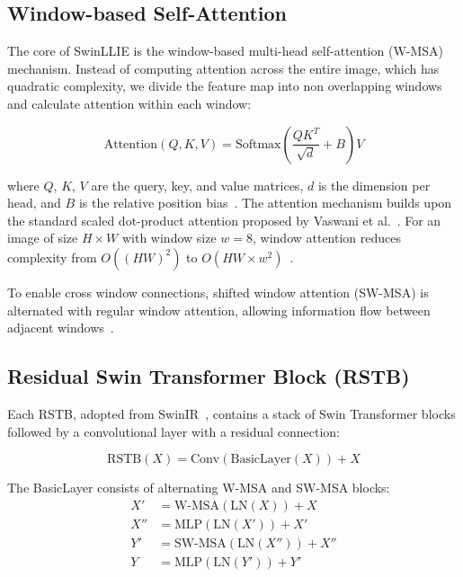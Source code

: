 \documentclass[sigconf]{acmart}
\begin{document}
\subsection{Window-based Self-Attention}

The core of SwinLLIE is the window-based multi-head self-attention (W-MSA) mechanism. Instead of computing attention across the entire image, which has quadratic complexity, we divide the feature map into non overlapping windows and calculate attention within each window:

\begin{equation}
\text{Attention}(Q, K, V) = \text{Softmax}\left(\frac{QK^T}{\sqrt{d}} + B\right)V
\end{equation}

where $Q$, $K$, $V$ are the query, key, and value matrices, $d$ is the dimension per head, and $B$ is the relative position bias~\cite{liu2021swin}. The attention mechanism builds upon the standard scaled dot-product attention proposed by Vaswani et al.~\cite{vaswani2017attention}. For an image of size $H \times W$ with window size $w = 8$, window attention reduces complexity from $O((HW)^2)$ to $O(HW \times w^2)$~\cite{liu2021swin}.

To enable cross window connections, shifted window attention (SW-MSA) is alternated with regular window attention, allowing information flow between adjacent windows~\cite{liu2021swin}.

\subsection{Residual Swin Transformer Block (RSTB)}

Each RSTB, adopted from SwinIR~\cite{liang2021swinir}, contains a stack of Swin Transformer blocks followed by a convolutional layer with a residual connection:

\begin{equation}
\text{RSTB}(X) = \text{Conv}(\text{BasicLayer}(X)) + X
\end{equation}

The BasicLayer consists of alternating W-MSA and SW-MSA blocks:
\begin{equation}
\begin{aligned}
X' &= \text{W-MSA}(\text{LN}(X)) + X \\
X'' &= \text{MLP}(\text{LN}(X')) + X' \\
Y' &= \text{SW-MSA}(\text{LN}(X'')) + X'' \\
Y &= \text{MLP}(\text{LN}(Y')) + Y'
\end{aligned}
\end{equation}
\end{document}

